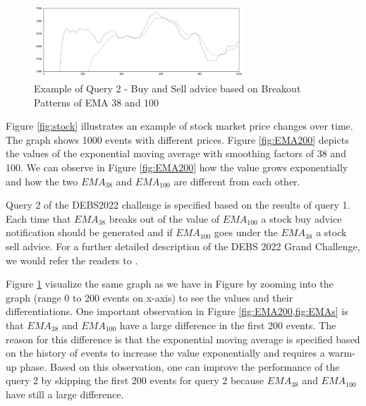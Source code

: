 \begin{figure}[!ht]
    \begin{center}
        \includegraphics[width=0.70\textwidth]{./images/query2_example.png}
        \caption{Example of Query 2 - Buy and Sell advice based on Breakout Patterns of EMA 38 and 100 }
        \label{fig:EMAs}
    \end{center}
\end{figure}


Figure \ref{fig:stock} illustrates an example of stock market price changes over time. The graph shows 1000 events with 
different prices. Figure \ref{fig:EMA200} depicts the values of the exponential moving average with 
smoothing factors of 38 and 100. We can observe in Figure \ref{fig:EMA200} how the value grows exponentially 
and how the two $EMA_{38}$ and $EMA_{100}$ are different from each other. 

Query 2 of the DEBS2022 challenge \cite{debs2022challenge} is specified based on the results of query 1. Each time 
that $EMA_{38}$ breaks out of the value of $EMA_{100}$ a stock buy advice notification should be generated and if
$EMA_{100}$ goes under the $EMA_{38}$ a stock sell advice. For a further detailed description of the DEBS 2022 
Grand Challenge, we would refer the readers to \cite{debs2022challenge}. 

Figure \ref{fig:EMAs} visualize the same graph as we have in Figure \label{fig:EMAs} by 
zooming into the graph (range 0 to 200 events on x-axis) to see the values and their differentiations. One important observation in 
Figure \ref{fig:EMA200,fig:EMAs} is that $EMA_{38}$ and $EMA_{100}$ have a large difference in the first 
200 events.  The reason for this difference is that the exponential moving average is specified based 
on the history of events to increase the value exponentially and requires a warm-up phase. Based on this observation,
one can improve the performance of the query 2 by skipping the first 200 events for query 2 because 
$EMA_{38}$ and $EMA_{100}$ have still a large difference. 

